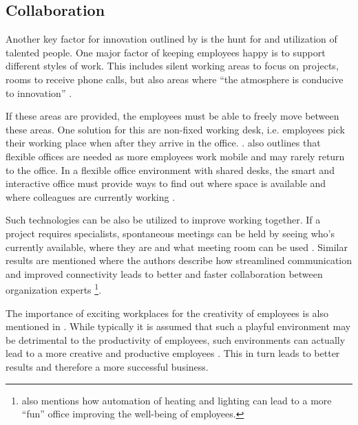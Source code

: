 \subsection{Collaboration}\label{sec:collaboration}
Another key factor for innovation outlined by \cite{hub13} is the hunt for and utilization of talented people. One major factor of keeping employees happy is to support different styles of work. This includes silent working areas to focus on projects, rooms to receive phone calls, but also areas where ``the atmosphere is conducive to innovation'' \cite{tieto}.

If these areas are provided, the employees must be able to freely move between these areas. One solution for this are non-fixed working desk, i.e. employees pick their working place when after they arrive in the office. \cite{occupiee}.  also outlines that flexible offices are needed as more employees work mobile and may rarely return to the office. In a flexible office environment with shared desks, the smart and interactive office must provide ways to find out where space is available and where colleagues are currently working \cite{tieto}.

Such technologies can be also be utilized to improve working together. If a project requires specialists, spontaneous meetings can be held by seeing who's currently available, where they are and what meeting room can be used \cite{tieto}. Similar results are mentioned \cite{hbcommunications} where the authors describe how streamlined communication and improved connectivity leads to better and faster collaboration between organization experts \footnote{\cite{hbcommunications} also mentions how automation of heating and lighting can lead to a more ``fun'' office improving the well-being of employees.}.

The importance of exciting workplaces for the creativity of employees is also mentioned in \cite{roomzilla3}. While typically it is assumed that such a playful environment may be detrimental to the productivity of employees, such environments can actually lead to a more creative and productive employees \cite{metroffice}. This in turn leads to better results and therefore a more successful business.


